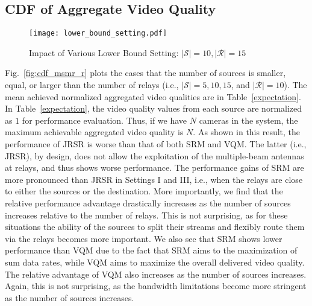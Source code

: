\documentclass[conference]{IEEEtran}
\begin{document}
\subsection{CDF of Aggregate Video Quality}\label{sec:sim01}


\begin{figure}[t!]
	\begin{center}
		\texttt{[image: lower\_bound\_setting.pdf]}
	\end{center}
	\caption{Impact of Various Lower Bound Setting: $|\mathcal{S}|=10, |\mathcal{R}|=15$}
	\label{fig:lower}
\end{figure}	

\begin{figure*}[t!]
	\centering
	\caption{Simulation Results: Number of Sources ($|\mathcal{S}|=5, 10, 15$) and Fixed Number of Relays ($|\mathcal{R}|=10$)}
	\label{fig:cdf_msmr_r}
\end{figure*}

Fig.~\ref{fig:cdf_msmr_r} plots the cases that the number of sources is smaller, equal, or larger than the number of relays (i.e., $|\mathcal{S}|=5, 10, 15$, and $|\mathcal{R}|=10$).
The mean achieved normalized aggregated video qualities are in Table~\ref{expectation}.
In Table~\ref{expectation}, the video quality values from each source are normalized as $1$ for performance evaluation.
Thus, if we have $N$ cameras in the system, the maximum achievable aggregated video quality is $N$.
As shown in this result, the performance of \textsf{JRSR} is worse than that of both \textsf{SRM} and \textsf{VQM}.
The latter (i.e., \textsf{JRSR}), by design, does not allow the exploitation of the multiple-beam antennas at relays, and thus shows worse performance.
The performance gains of \textsf{SRM} are more pronounced than \textsf{JRSR} in Settings I and III, i.e., when the relays are close to either the sources or the destination. More importantly, we find that the relative performance advantage drastically increases as the number of sources increases relative to the number of relays. This is not surprising, as for these situations the ability of the sources to split their streams and flexibly route them via the relays becomes more important.
We also see that \textsf{SRM} shows lower performance than \textsf{VQM} due to the fact that \textsf{SRM} aims to the maximization of sum data rates, while \textsf{VQM} aims to maximize the overall delivered video quality.
The relative advantage of \textsf{VQM} also increases as the number of sources increases. Again, this is not surprising, as the bandwidth limitations become more stringent as the number of sources increases.
\end{document}
